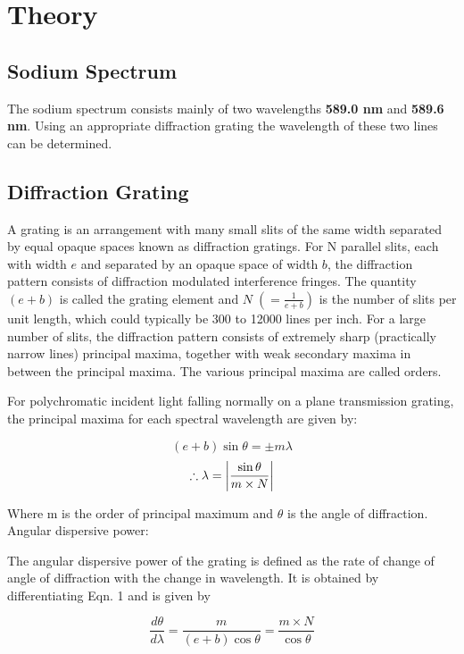 \section{Theory}

	\subsection{Sodium Spectrum}
	The sodium spectrum consists mainly of two wavelengths \textbf{589.0 nm} and \textbf{589.6 nm}. Using an appropriate diffraction grating the wavelength of these two lines can be determined.

	\subsection{Diffraction Grating}
	A grating is an arrangement with many small slits of the same width separated by equal opaque spaces known as diffraction gratings. For N parallel slits, each with width $e$ and separated by an opaque space of width $b$, the diffraction pattern consists of diffraction modulated interference fringes. The quantity $(e+b)$ is called the grating element and $N \; (= \frac{1}{e+b})$ is the number of slits per unit length, which could typically be 300 to 12000 lines per inch. For a large number of slits, the diffraction pattern consists of extremely sharp (practically narrow lines) principal maxima, together with weak secondary maxima in between the principal maxima. The various principal maxima are called orders.

	For polychromatic incident light falling normally on a plane transmission grating, the principal maxima for each spectral wavelength are given by:

	$$(e+b) \sin\theta = \pm m \lambda$$
	\begin{equation}
		\therefore \lambda = \abs{\frac{\sin\theta}{m \times N}}
	\end{equation}\label{eqn:1}

	Where m is the order of principal maximum and $\theta$ is the angle of diffraction. Angular dispersive power:

	The angular dispersive power of the grating is defined as the rate of change of angle of diffraction with the change in wavelength. It is obtained by differentiating Eqn. 1 and is given by

	\begin{equation}
		\frac{d\theta}{d\lambda} = \frac{m}{(e+b)\cos\theta} = \frac{m\times N}{\cos\theta}
	\end{equation}\label{eqn:2}